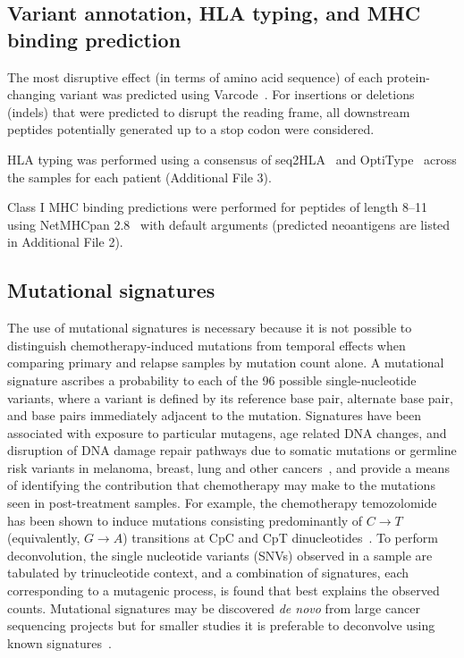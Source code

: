 \subsection*{Variant annotation, HLA typing, and MHC binding prediction}
\begin{sloppypar}
The most disruptive effect (in terms of amino acid sequence) of each protein-changing variant was predicted using Varcode~\cite{2016}. For insertions or deletions (indels) that were predicted to disrupt the reading frame, all downstream peptides potentially generated up to a stop codon were considered.

HLA typing was performed using a consensus of seq2HLA~\cite{Boegel_2012} and OptiType~\cite{Szolek_2014} across the samples for each patient (Additional File 3).

Class I MHC binding predictions were performed for peptides of length 8--11 using NetMHCpan 2.8~\cite{Lundegaard_2008} with default arguments (predicted neoantigens are listed in Additional File 2).
\end{sloppypar}

\subsection*{Mutational signatures}
The use of mutational signatures is necessary because it is not possible to distinguish chemotherapy-induced mutations from temporal effects when comparing primary and relapse samples by mutation count alone. A mutational signature ascribes a probability to each of the 96 possible single-nucleotide variants, where a variant is defined by its reference base pair, alternate base pair, and base pairs immediately adjacent to the mutation. Signatures have been associated with exposure to particular mutagens, age related DNA changes, and disruption of DNA damage repair pathways due to somatic mutations or germline risk variants in melanoma, breast, lung and other cancers~\cite{Alexandrov2013}, and provide a means of identifying the contribution that chemotherapy may make to the mutations seen in post-treatment samples. For example, the chemotherapy temozolomide has been shown to induce mutations consisting predominantly of $C \rightarrow T$ (equivalently, $G \rightarrow A$) transitions at CpC and CpT dinucleotides~\cite{Johnson_2013}. To perform deconvolution, the single nucleotide variants (SNVs) observed in a sample are tabulated by trinucleotide context, and a combination of signatures, each corresponding to a mutagenic process, is found that best explains the observed counts. Mutational signatures may be discovered \textit{de novo} from large cancer sequencing projects but for smaller studies it is preferable to deconvolve using known signatures~\cite{Rosenthal_2016}.

